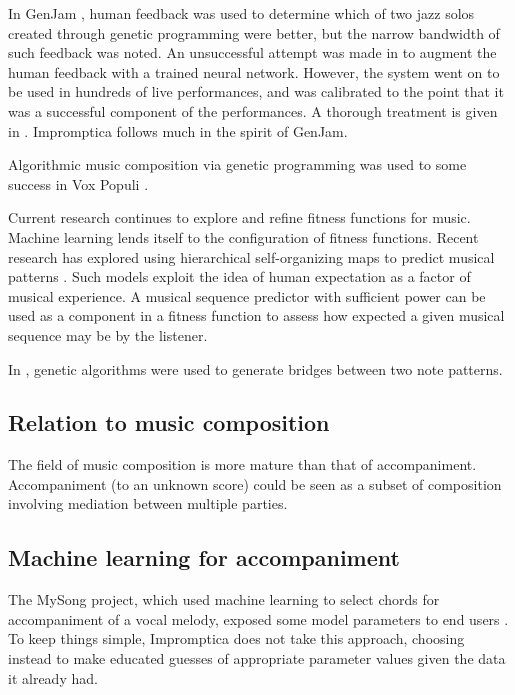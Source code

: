 \documentclass[11pt,conference,letterpaper]{IEEEtran}
\begin{document}
In GenJam \cite{biles1994genjam}, human feedback was used to determine which of two jazz solos created through genetic programming were better, but the narrow bandwidth of such feedback was noted. An unsuccessful attempt was made in \cite{biles1996neural} to augment the human feedback with a trained neural network. However, the system went on to be used in hundreds of live performances, and was calibrated to the point that it was a successful component of the performances. A thorough treatment is given in \cite{biles2007improvizing}. Impromptica follows much in the spirit of GenJam.

Algorithmic music composition via genetic programming was used to some success in Vox Populi \cite{moroni2000vox}.

Current research continues to explore and refine fitness functions for music. Machine learning lends itself to the configuration of fitness functions. Recent research has explored using hierarchical self-organizing maps to predict musical patterns \cite{law2008towards}. Such models exploit the idea of human expectation as a factor of musical experience. A musical sequence predictor with sufficient power can be used as a component in a fitness function to assess how expected a given musical sequence may be by the listener.

In \cite{horner1991genetic}, genetic algorithms were used to generate bridges between two note patterns.

\subsection{Relation to music composition}

The field of music composition is more mature than that of accompaniment. Accompaniment (to an unknown score) could be seen as a subset of composition involving mediation between multiple parties.

\subsection{Machine learning for accompaniment}

The MySong project, which used machine learning to select chords for accompaniment of a vocal melody, exposed some model parameters to end users \cite{morris2008exposing}. To keep things simple, Impromptica does not take this approach, choosing instead to make educated guesses of appropriate parameter values given the data it already had.
\end{document}
